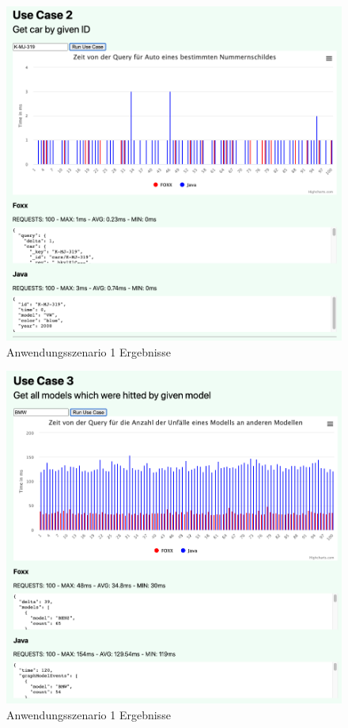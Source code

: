 \begin{figure}[htbp] 
  	\centering
     \includegraphics[width=1\textwidth]{./images/8.UseCase2.png}
 	\caption{Anwendungsszenario 1 Ergebnisse}
  \label{fig:DataSchema}
\end{figure}

\begin{figure}[htbp] 
  	\centering
     \includegraphics[width=1\textwidth]{./images/8.UseCase3.png}
 	\caption{Anwendungsszenario 1 Ergebnisse}
  \label{fig:DataSchema}
\end{figure}

